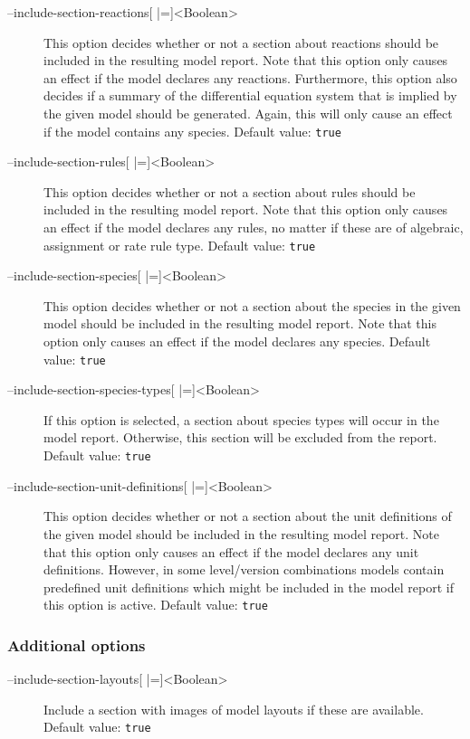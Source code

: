 \begin{description}
\item[--include-section-reactions{[} |={]}<Boolean>]
  This option decides whether or not a section about reactions
  should be included in the resulting model report. Note that
  this option only causes an effect if the model declares any
  reactions. Furthermore, this option also decides if a summary
  of the differential equation system that is implied by the given
  model should be generated. Again, this will only cause an effect
  if the model contains any species.
  Default value: \texttt{true}

\item[--include-section-rules{[} |={]}<Boolean>]
  This option decides whether or not a section about rules should
  be included in the resulting model report. Note that this option
  only causes an effect if the model declares any rules, no matter
  if these are of algebraic, assignment or rate rule type.
  Default value: \texttt{true}

\item[--include-section-species{[} |={]}<Boolean>]
  This option decides whether or not a section about the species
  in the given model should be included in the resulting model
  report. Note that this option only causes an effect if the model
  declares any species.
  Default value: \texttt{true}

\item[--include-section-species-types{[} |={]}<Boolean>]
  If this option is selected, a section about species types will
  occur in the model report. Otherwise, this section will be excluded
  from the report.
  Default value: \texttt{true}

\item[--include-section-unit-definitions{[} |={]}<Boolean>]
  This option decides whether or not a section about the unit definitions
  of the given model should be included in the resulting model
  report. Note that this option only causes an effect if the model
  declares any unit definitions. However, in some level/version
  combinations \SBML models contain predefined unit definitions
  which might be included in the model report if this option is
  active.
  Default value: \texttt{true}
\end{description}

\subsubsection{Additional options}
\begin{description}
\item[--include-section-layouts{[} |={]}<Boolean>]
  Include a section with images of model layouts if these are available.
  Default value: \texttt{true}
\end{description}

